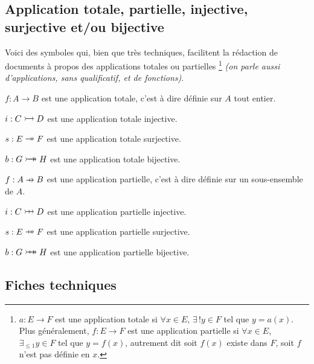 \documentclass[12pt,a4paper]{article}
\begin{document}

\subsection{Application totale, partielle, injective, surjective et/ou bijective}

Voici des symboles qui, bien que très techniques, facilitent la rédaction de documents à propos des applications totales ou partielles
\footnote{
	$a: E \to F$ est une application totale si $\forall x \in E$, $\exists\,! y \in F$ tel que $y = a(x)$. 
	Plus généralement, $f: E \to F$ est une application partielle si $\forall x \in E$, $\exists_{\leq 1} y \in F$ tel que $y = f(x)$, autrement dit soit $f(x)$ existe dans $F$, soit $f$ n'est pas définie en $x$.
}
\emph{(on parle aussi d'applications, sans qualificatif, et de fonctions)}.





\begin{latexex-flat}
$f: A \to B$ est une application totale, c'est à dire définie sur $A$ tout entier.

$i: C \onetoone D$ est une application totale injective.

$s: E \onto F$ est une application totale surjective.

$b: G \biject H$ est une application totale bijective.
\end{latexex-flat}





\begin{latexex-flat}
$f: A \pto B$ est une application partielle, c'est à dire définie sur
un sous-ensemble de $A$.

$i: C \ponetoone D$ est une application partielle injective.

$s: E \ponto F$ est une application partielle surjective.

$b: G \pbiject H$ est une application partielle bijective.
\end{latexex-flat}




\subsection{Fiches techniques}

\vspace{-.75em}
\begin{multicols}{2}
    
    
    
    
    
    
    
\end{multicols}
\end{document}
